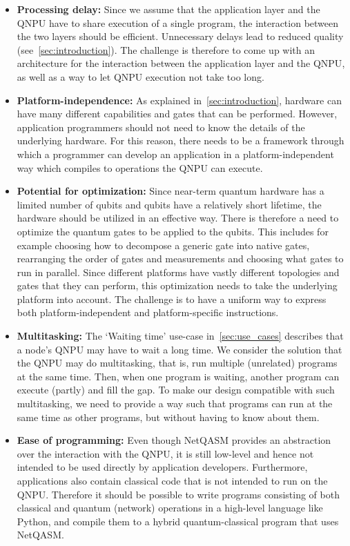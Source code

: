 \begin{itemize}
      \item \textbf{Processing delay:}
            Since we assume that the application layer and the \ac{QNPU} have to share execution of a single program, the interaction between the two layers should be efficient.
            Unnecessary delays lead to reduced quality (see~\cref{sec:introduction}).
            The challenge is therefore to come up with an architecture for the interaction between the application layer and the \ac{QNPU}, as well as a way to let \ac{QNPU} execution not take too long.
      \item \textbf{Platform-independence:}
            As explained in~\cref{sec:introduction}, hardware can have many different capabilities and gates that can be performed.
            However, application programmers should not need to know the details of the underlying hardware.
            For this reason, there needs to be a framework through which a programmer can develop an application in a platform-independent way which compiles to operations the \ac{QNPU} can execute.
      \item \textbf{Potential for optimization:}
            Since near-term quantum hardware has a limited number of qubits and qubits have a relatively short lifetime, the hardware should be utilized in an effective way.
            There is therefore a need to optimize the quantum gates to be applied to the qubits.
            This includes for example choosing how to decompose a generic gate into native gates, rearranging the order of gates and measurements and choosing what gates to run in parallel.
            Since different platforms have vastly different topologies and gates that they can perform, this optimization needs to take the underlying platform into account.
            The challenge is to have a uniform way to express both platform-independent and platform-specific instructions.
      \item \textbf{Multitasking:}
            The `Waiting time' use-case in~\cref{sec:use_cases} describes that a node's \ac{QNPU} may have to wait a long time. We consider the solution that the \ac{QNPU} may do multitasking, that is, run multiple (unrelated) programs at the same time.
            Then, when one program is waiting, another program can execute (partly) and fill the gap.
            To make our design compatible with such multitasking, we need to provide a way such that programs can run at the same time as other programs, but without having to know about them.
      \item \textbf{Ease of programming:}
            Even though \ac{NetQASM} provides an abstraction over the interaction with the \ac{QNPU}, it is still low-level and hence not intended to be used directly by application developers.
            Furthermore, applications also contain classical code that is not intended to run on the \ac{QNPU}.
            Therefore it should be possible to write programs consisting of both classical and quantum (network) operations in a high-level language like Python, and compile them to a hybrid quantum-classical program that uses \ac{NetQASM}.

\end{itemize}


